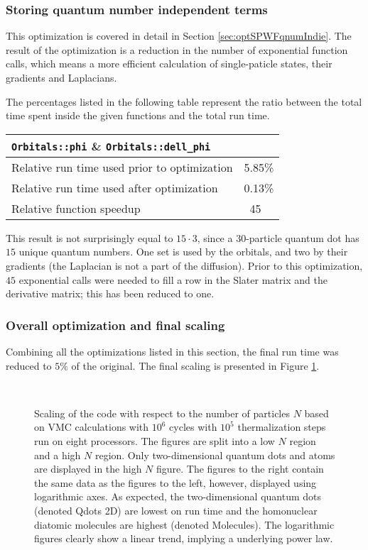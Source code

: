 \subsubsection{Storing quantum number independent terms}

This optimization is covered in detail in Section \ref{sec:optSPWFqnumIndie}. The result of the optimization is a reduction in the number of exponential function calls, which means a more efficient calculation of single-paticle states, their gradients and Laplacians.

The percentages listed in the following table represent the ratio between the total time spent inside the given functions and the total run time. 

\begin{tabular}{ll}
 \verb+Orbitals::phi+ \& \verb+Orbitals::dell_phi+ & \\
 \hline\hline
 Relative run time used prior to optimization & 5.85\% \\
 Relative run time used after optimization    & 0.13\% \\
 \hline
 Relative function speedup                   & ~45
\end{tabular}

This result is not surprisingly equal to $15\cdot 3$, since a 30-particle quantum dot has $15$ unique quantum numbers. One set is used by the orbitals, and two by their gradients (the Laplacian is not a part of the diffusion). Prior to this optimization, $45$ exponential calls were needed to fill a row in the Slater matrix and the derivative matrix; this has been reduced to one.

\subsubsection{Overall optimization and final scaling}

Combining all the optimizations listed in this section, the final run time was reduced to $5\%$ of the original. The final scaling is presented in Figure \ref{fig:scaling}.

\begin{figure}[h]
 \begin{center}
   \\
  \caption{Scaling of the code with respect to the number of particles $N$ based on VMC calculations with $10^6$ cycles with $10^5$ thermalization steps run on eight processors. The figures are split into a low $N$ region and a high $N$ region. Only two-dimensional quantum dots and atoms are displayed in the high $N$ figure. The figures to the right contain the same data as the figures to the left, however, displayed using logarithmic axes. As expected, the two-dimensional quantum dots (denoted Qdots 2D) are lowest on run time and the homonuclear diatomic molecules are highest (denoted Molecules). The logarithmic figures clearly show a linear trend, implying a underlying power law.}
  \label{fig:scaling}
 \end{center}
\end{figure}

